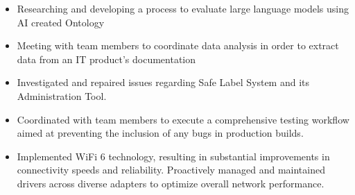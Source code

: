\documentclass[10pt,a4paper,ragged2e,withhyper]{altacv}
\begin{document}
    
    \begin{paracol}{2}
    

        
    

    \begin{itemize}
        \item Researching and developing a process to evaluate large language models using AI created Ontology
        \item Meeting with team members to coordinate data analysis in order to extract data from an IT product's documentation

    \end{itemize}
    
 \smallskip \smallskip
    \newline
    \newline

    \divider

\begin{itemize}
\item Investigated and repaired issues regarding Safe Label System and its Administration Tool.
\item Coordinated with team members to execute a comprehensive testing workflow aimed at preventing the inclusion of any bugs in production builds.
\item Implemented WiFi 6 technology, resulting in substantial improvements in connectivity speeds and reliability. Proactively managed and maintained drivers across diverse adapters to optimize overall network performance.
\end{itemize}
    \smallskip \smallskip
    \newline
    \newline
    

\end{paracol}
\end{document}

